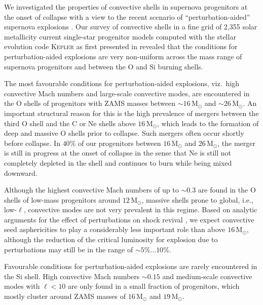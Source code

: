 \documentclass[useAMS,usenatbib]{mnras}
\newcommand{\Msun}{\ensuremath{\mathrm{M}_\odot}}
\begin{document}
We investigated the properties of convective shells in supernova
progenitors at the onset of collapse with a view to the recent
scenario of ``perturbation-aided'' supernova explosions
\citep{couch_13,couch_15,mueller_15a,mueller_17}.  Our survey of
convective shells in a fine grid of 2,355 solar metallicity
current single-star progenitor models computed with the stellar
evolution code \textsc{Kepler} \citep{weaver_78,heger_10} as first
presented in \citet{mueller_16a} revealed that the conditions for
perturbation-aided explosions are very non-uniform across the mass
range of supernova progenitors and between the O and Si burning
shells.

The most favourable conditions for perturbation-aided explosions,
viz.\ high convective Mach numbers and large-scale convective modes,
are encountered in the O shells of progenitors with ZAMS masses
between $\mathord{\sim} 16 \,\Msun$ and $\mathord{\sim} 26 \,\Msun$.
An important structural reason for this is the high prevalence of
mergers between the third O shell and the C or Ne shells above $16
\,\Msun$, which leads to the formation of deep and massive O shells
prior to collapse. Such mergers often occur shortly before collapse.
In $40\%$ of our progenitors between $16 \,\Msun$ and $26 \,\Msun$,
the merger is still in progress at the onset of collapse in the sense
that Ne is still not completely depleted in the shell and continues to
burn while being mixed downward.

Although the highest convective Mach numbers of up to $\mathord{\sim}
0.3$ are found in the O shells of low-mass progenitors around $12\,\Msun$, massive shells prone to global, i.e., low-$\ell$, convective
  modes are not very prevalent in this regime.
Based on analytic arguments for the effect of perturbations
on shock revival \citep{mueller_16c}, we expect
convective seed asphericities to play a considerably less
important role
than above $16 \,\Msun$, although the reduction
of the critical luminosity for explosion due to perturbations
may still be in the range of $\mathord{\sim}5\%\ldots 10\%$.

Favourable conditions for perturbation-aided explosions are rarely
encountered in the Si shell. High convective Mach numbers $\sim 0.15$
and medium-scale convective modes with $\ell <10$ are only found
in a small fraction of progenitors, which mostly cluster around ZAMS
masses of $16 \,\Msun$ and $19 \,\Msun$.
\end{document}
